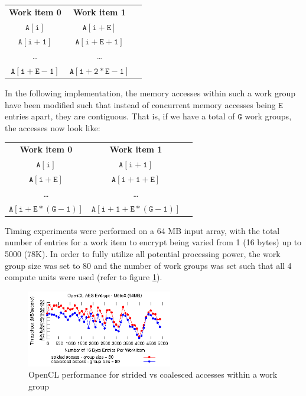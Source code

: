 \documentclass[conference,10pt]{IEEEtran}
\begin{document}
\begin{table}[h]
\centering
\begin{tabular}{ccc}
    \textbf{Work item 0} & \textbf{Work item 1} \\
    $\mathtt{A[i]}$         & $\mathtt{A[i + E]}$ \\
    $\mathtt{A[i + 1]}$     & $\mathtt{A[i + E + 1]}$ \\
    \ldots       & \ldots \\
    $\mathtt{A[i + E - 1]}$ & $\mathtt{A[i + 2*E - 1]}$ \\
\end{tabular}
\end{table}

In the following implementation, the memory accesses within such a work group have been modified such that 
instead of concurrent memory accesses being $\mathtt{E}$ entries apart, they are contiguous.  That is, if 
we have a total of $\mathtt{G}$ work groups, the accesses now look like:

\newpage

\begin{table}[h]
\centering
\begin{tabular}{ccc}
    \textbf{Work item 0} & \textbf{Work item 1} \\
    $\mathtt{A[i]}$         & $\mathtt{A[i + 1]}$ \\
    $\mathtt{A[i + E]}$     & $\mathtt{A[i + 1 + E]}$ \\
    \ldots       & \ldots \\
    $\mathtt{A[i + E*(G - 1)]}$ & $\mathtt{A[i + 1 + E*(G - 1)]}$ \\
\end{tabular}
\end{table}

Timing experiments were performed on a 64 MB input array, with the total number of entries for a work item 
to encrypt being varied from 1 (16 bytes) up to 5000 (78K).  In order to fully utilize all potential 
processing power, the work group size was set to 80 and the number of work groups was set such that all 4 
compute units were used (refer to figure \ref{fig:coalesce}).

\begin{figure}[!t]
\centering
\includegraphics[width=2.5in]{../final/motox/4.2/sample_opencl_aes_entries.64MB.4_work_groups.5000_max_entries.both.eps}
\caption{OpenCL performance for strided vs coalesced accesses within a work group}
\label{fig:coalesce}
\end{figure}
\end{document}
